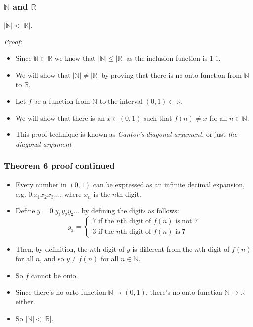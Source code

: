\documentclass[handout]{beamer}
\newcommand{\bN}{\mathbb{N}}
\newcommand{\bR}{\mathbb{R}}
\begin{document}
\begin{frame}
\frametitle{$\bN$ and $\bR$}
\begin{theorem}
$|\bN|<|\bR|$.
\end{theorem}
\emph{Proof:}
\begin{itemize}
\item Since $\bN\subset \bR$ we know that $|\bN|\leq |\bR|$ as the inclusion function is 1-1. 
\item We will show that $|\bN|\neq |\bR|$ by proving that there is no onto function from $\bN$ to $\bR$. 
\item Let $f$ be a function from $\bN$ to the interval $(0,1)\subset \bR$.
\item We will show that there is an $x\in(0,1)$ such that $f(n)\neq x$ for all $n\in\bN$. 
\item This proof technique is known as \emph{Cantor's diagonal argument}, or just \emph{the diagonal argument}. 
\end{itemize}
\end{frame}

\begin{frame}
\frametitle{Theorem 6 proof continued}
\begin{itemize}
\item Every number in $(0,1)$ can be expressed as an infinite decimal expansion, e.g. $0.x_1x_2x_3\ldots$, where $x_n$ is the $n$th digit. 
\item Define $y=0.y_1y_2y_3\ldots$ by defining the digits as follows: 
\[y_n = \begin{cases} 7 \text{ if the $n$th digit of $f(n)$ is not $7$}\\
3  \text{ if the $n$th digit of $f(n)$ is $7$}\end{cases}\]  
\item Then, by definition, the $n$th digit of $y$ is different from the $n$th digit of $f(n)$ for all $n$, and so $y\neq f(n)$ for all $n\in\bN$.
\item So $f$ cannot be onto.
\item Since there's no onto function $\bN\to (0,1)$, there's no onto function $\bN\to \bR$ either.
\item So $|\bN|<|\bR|$.
\end{itemize}
\end{frame}
\end{document}
